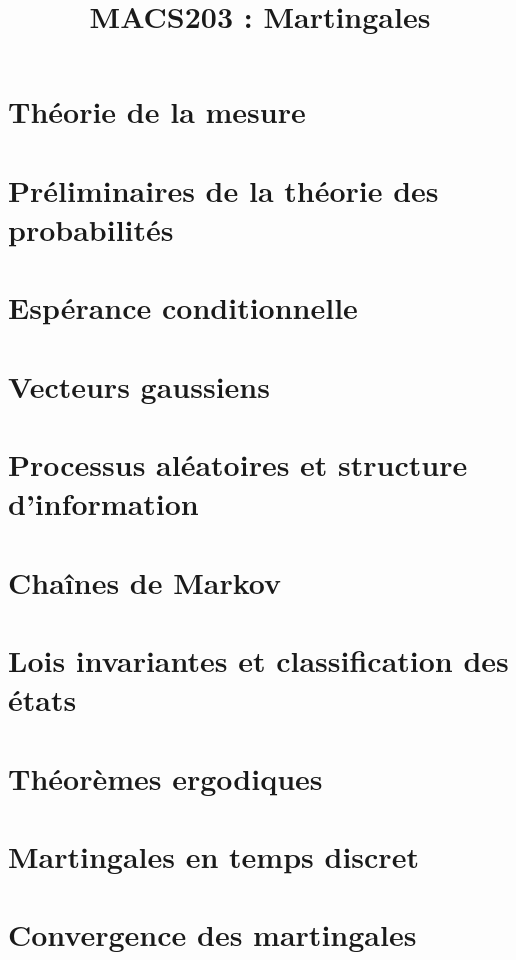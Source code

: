 \documentclass[a4paper,9pt]{article}
\title{\vspace{-1.2cm} \textbf{MACS203 : Martingales}}
\begin{document}
\maketitle

\vspace{-1.5cm}

\section{Théorie de la mesure}

	

\section{Préliminaires de la théorie des probabilités}

	

\section{Espérance conditionnelle}

	

\section{Vecteurs gaussiens}

	

\section{Processus aléatoires et structure d'information}

	

\section{Chaînes de Markov}

	

\section{Lois invariantes et classification des états}

	

\section{Théorèmes ergodiques}

	

\section{Martingales en temps discret}

	

\section{Convergence des martingales}

	
\end{document}
